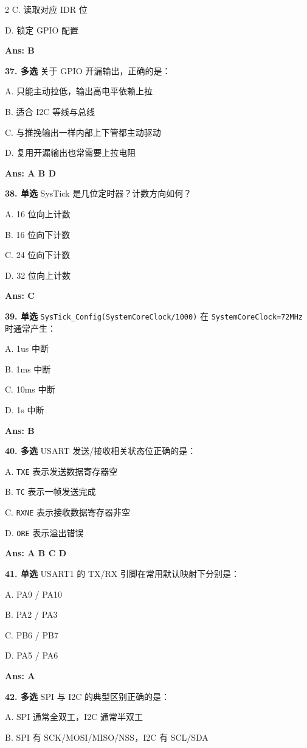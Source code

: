 \documentclass[UTF8,zihao=-5]{ctexart}
\begin{document}
\begin{multicols*}{2}
C. 读取对应 IDR 位\par
D. 锁定 GPIO 配置\par
\textbf{Ans: B}\par
\textbf{37. 多选} 关于 GPIO 开漏输出，正确的是：\par
A. 只能主动拉低，输出高电平依赖上拉\par
B. 适合 I2C 等线与总线\par
C. 与推挽输出一样内部上下管都主动驱动\par
D. 复用开漏输出也常需要上拉电阻\par
\textbf{Ans: A B D}\par
\textbf{38. 单选} SysTick 是几位定时器？计数方向如何？\par
A. 16 位向上计数\par
B. 16 位向下计数\par
C. 24 位向下计数\par
D. 32 位向上计数\par
\textbf{Ans: C}\par
\textbf{39. 单选} \texttt{SysTick\_Config(SystemCoreClock/1000)} 在 \texttt{SystemCoreClock=72MHz} 时通常产生：\par
A. 1us 中断\par
B. 1ms 中断\par
C. 10ms 中断\par
D. 1s 中断\par
\textbf{Ans: B}\par
\textbf{40. 多选} USART 发送/接收相关状态位正确的是：\par
A. \texttt{TXE} 表示发送数据寄存器空\par
B. \texttt{TC} 表示一帧发送完成\par
C. \texttt{RXNE} 表示接收数据寄存器非空\par
D. \texttt{ORE} 表示溢出错误\par
\textbf{Ans: A B C D}\par
\textbf{41. 单选} USART1 的 TX/RX 引脚在常用默认映射下分别是：\par
A. PA9 / PA10\par
B. PA2 / PA3\par
C. PB6 / PB7\par
D. PA5 / PA6\par
\textbf{Ans: A}\par
\textbf{42. 多选} SPI 与 I2C 的典型区别正确的是：\par
A. SPI 通常全双工，I2C 通常半双工\par
B. SPI 有 SCK/MOSI/MISO/NSS，I2C 有 SCL/SDA\par

\end{multicols*}
\end{document}
